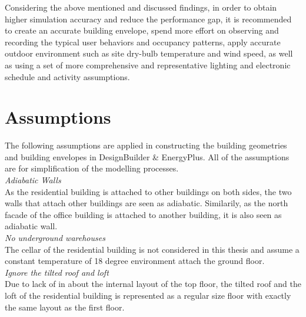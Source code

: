\documentclass[a4paper, oneside]{discothesis}
\begin{document}
    
    Considering the above mentioned and discussed findings, in order to obtain higher simulation accuracy and reduce the performance gap, it is recommended to create an accurate building envelope, spend more effort on observing and recording the typical user behaviors and occupancy patterns, apply accurate outdoor environment such as site dry-bulb temperature and wind speed, as well as using a set of more comprehensive and representative lighting and electronic schedule and activity assumptions.








\appendix

\chapter{Assumptions}\label{sec:assumptions}

	The following assumptions are applied in constructing the building geometries and building envelopes in DesignBuilder \& EnergyPlus. All of the assumptions are for simplification of the modelling processes.\\ 

	\textit{Adiabatic Walls}\\
	As the residential building is attached to other buildings on both sides, the two walls that attach other buildings are seen as adiabatic. Similarily, as the north facade of the office building is attached to another building, it is also seen as adiabatic wall.\\

	\textit{No underground warehouses}\\
	The cellar of the residential building is not considered in this thesis and assume a constant temperature of 18 degree environment attach the ground floor.\\

	\textit{Ignore the tilted roof and loft}\\
	Due to lack of in about the internal layout of the top floor, the tilted roof and the loft of the residential building is represented as a regular size floor with exactly the same layout as the first floor.\\
\end{document}
